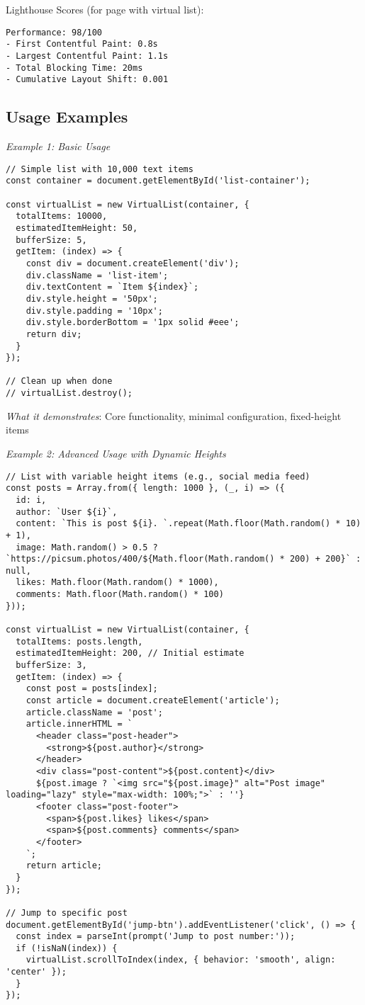 \documentclass[11pt]{article}
\begin{document}
Lighthouse Scores (for page with virtual list):
\begin{verbatim}
Performance: 98/100
- First Contentful Paint: 0.8s
- Largest Contentful Paint: 1.1s
- Total Blocking Time: 20ms
- Cumulative Layout Shift: 0.001
\end{verbatim}
\subsection{Usage Examples}
\label{sec:orgc3e8dba}

\emph{Example 1: Basic Usage}

\begin{verbatim}
// Simple list with 10,000 text items
const container = document.getElementById('list-container');

const virtualList = new VirtualList(container, {
  totalItems: 10000,
  estimatedItemHeight: 50,
  bufferSize: 5,
  getItem: (index) => {
    const div = document.createElement('div');
    div.className = 'list-item';
    div.textContent = `Item ${index}`;
    div.style.height = '50px';
    div.style.padding = '10px';
    div.style.borderBottom = '1px solid #eee';
    return div;
  }
});

// Clean up when done
// virtualList.destroy();
\end{verbatim}

\emph{What it demonstrates}: Core functionality, minimal configuration, fixed-height items

\emph{Example 2: Advanced Usage with Dynamic Heights}

\begin{verbatim}
// List with variable height items (e.g., social media feed)
const posts = Array.from({ length: 1000 }, (_, i) => ({
  id: i,
  author: `User ${i}`,
  content: `This is post ${i}. `.repeat(Math.floor(Math.random() * 10) + 1),
  image: Math.random() > 0.5 ? `https://picsum.photos/400/${Math.floor(Math.random() * 200) + 200}` : null,
  likes: Math.floor(Math.random() * 1000),
  comments: Math.floor(Math.random() * 100)
}));

const virtualList = new VirtualList(container, {
  totalItems: posts.length,
  estimatedItemHeight: 200, // Initial estimate
  bufferSize: 3,
  getItem: (index) => {
    const post = posts[index];
    const article = document.createElement('article');
    article.className = 'post';
    article.innerHTML = `
      <header class="post-header">
        <strong>${post.author}</strong>
      </header>
      <div class="post-content">${post.content}</div>
      ${post.image ? `<img src="${post.image}" alt="Post image" loading="lazy" style="max-width: 100%;">` : ''}
      <footer class="post-footer">
        <span>${post.likes} likes</span>
        <span>${post.comments} comments</span>
      </footer>
    `;
    return article;
  }
});

// Jump to specific post
document.getElementById('jump-btn').addEventListener('click', () => {
  const index = parseInt(prompt('Jump to post number:'));
  if (!isNaN(index)) {
    virtualList.scrollToIndex(index, { behavior: 'smooth', align: 'center' });
  }
});
\end{verbatim}
\end{document}

